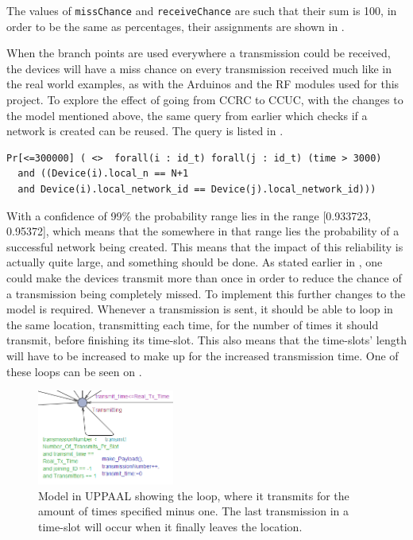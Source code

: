 \noindent
The values of \texttt{missChance} and \texttt{receiveChance} are such that their sum is 100, in order to be the same as percentages, their assignments are shown in .

When the branch points are used everywhere a transmission could be received, the devices will have a miss chance on every transmission received much like in the real world examples, as with the Arduinos and the RF modules used for this project.
To explore the effect of going from CCRC to CCUC, with the changes to the model mentioned above, the same query from earlier which checks if a network is created can be reused. 
The query is listed in .

\begin{lstlisting}[style=UPPAAL, caption={Query for UPPAAL which asks for the probability of all devices in a network being equal to the number of devices in the system, and that they all have the same \texttt{network\_id}}, label={query-SuccesfulCreate}]
Pr[<=300000] ( <>  forall(i : id_t) forall(j : id_t) (time > 3000) 
  and ((Device(i).local_n == N+1 
  and Device(i).local_network_id == Device(j).local_network_id)))
\end{lstlisting}

\noindent
With a confidence of 99\% the probability range lies in the range [0.933723, 0.95372], which means that the somewhere in that range lies the probability of a successful network being created.
This means that the impact of this reliability is actually quite large, and something should be done.
As stated earlier in , one could make the devices transmit more than once in order to reduce the chance of a transmission being completely missed.
To implement this further changes to the model is required.
Whenever a transmission is sent, it should be able to loop in the same location, transmitting each time, for the number of times it should transmit, before finishing its time-slot. 
This also means that the time-slots' length will have to be increased to make up for the increased transmission time.
One of these loops can be seen on .

\begin{figure}
\centering
	\vspace{-20pt}
  \includegraphics[width=0.4\textwidth]{Figures/Model/Transmit_Loop.png} 
\caption{Model in UPPAAL showing the loop, where it transmits for the amount of times specified minus one. The last transmission in a time-slot will occur when it finally leaves the location.}
\label{LoopTransmitUPPAAL}
\end{figure}

